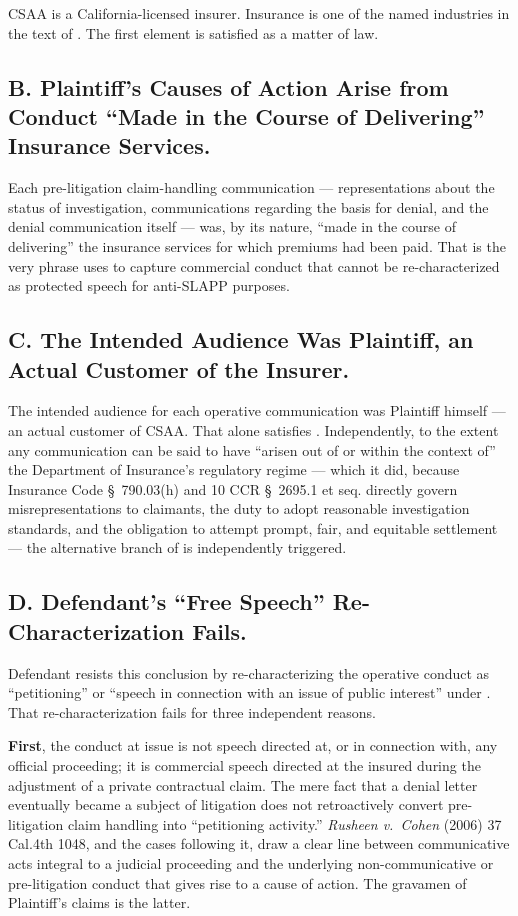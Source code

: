 CSAA is a California-licensed insurer. Insurance is one of the named industries in the text of . The first element is satisfied as a matter of law.

\subsection*{B. Plaintiff's Causes of Action Arise from Conduct ``Made in the Course of Delivering'' Insurance Services.}

Each pre-litigation claim-handling communication --- representations about the status of investigation, communications regarding the basis for denial, and the denial communication itself --- was, by its nature, ``made in the course of delivering'' the insurance services for which premiums had been paid. That is the very phrase  uses to capture commercial conduct that cannot be re-characterized as protected speech for anti-SLAPP purposes.

\subsection*{C. The Intended Audience Was Plaintiff, an Actual Customer of the Insurer.}

The intended audience for each operative communication was Plaintiff himself --- an actual customer of CSAA. That alone satisfies . Independently, to the extent any communication can be said to have ``arisen out of or within the context of'' the Department of Insurance's regulatory regime --- which it did, because Insurance Code \S~790.03(h) and 10 CCR \S~2695.1 et seq. directly govern misrepresentations to claimants, the duty to adopt reasonable investigation standards, and the obligation to attempt prompt, fair, and equitable settlement --- the alternative branch of  is independently triggered.

\subsection*{D. Defendant's ``Free Speech'' Re-Characterization Fails.}

Defendant resists this conclusion by re-characterizing the operative conduct as ``petitioning'' or ``speech in connection with an issue of public interest'' under . That re-characterization fails for three independent reasons.

\textbf{First}, the conduct at issue is not speech directed at, or in connection with, any official proceeding; it is commercial speech directed at the insured during the adjustment of a private contractual claim. The mere fact that a denial letter eventually became a subject of litigation does not retroactively convert pre-litigation claim handling into ``petitioning activity.'' \textit{Rusheen v.\ Cohen} (2006) 37 Cal.4th 1048, and the cases following it, draw a clear line between communicative acts integral to a judicial proceeding and the underlying non-communicative or pre-litigation conduct that gives rise to a cause of action. The gravamen of Plaintiff's claims is the latter.

